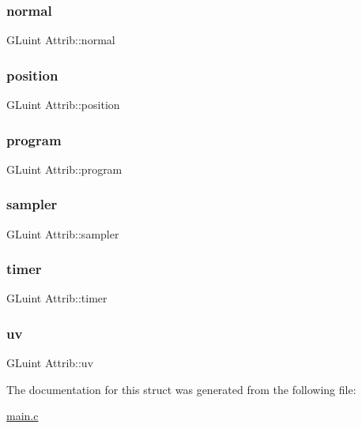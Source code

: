 \subsubsection{\texorpdfstring{normal}{normal}}
{\footnotesize\ttfamily G\+Luint Attrib\+::normal}

\mbox{\label{structAttrib_a2e8900e46275e6dba5de47a6cb3fb014}} 
\subsubsection{\texorpdfstring{position}{position}}
{\footnotesize\ttfamily G\+Luint Attrib\+::position}

\mbox{\label{structAttrib_accbe71d8cd2e04669694902abddf88fd}} 
\subsubsection{\texorpdfstring{program}{program}}
{\footnotesize\ttfamily G\+Luint Attrib\+::program}

\mbox{\label{structAttrib_ab176427e061e47c040d0a8d25488fd6d}} 
\subsubsection{\texorpdfstring{sampler}{sampler}}
{\footnotesize\ttfamily G\+Luint Attrib\+::sampler}

\mbox{\label{structAttrib_aa27da229009adea9e3729e80f7b200b5}} 
\subsubsection{\texorpdfstring{timer}{timer}}
{\footnotesize\ttfamily G\+Luint Attrib\+::timer}

\mbox{\label{structAttrib_a91a6c5203f836990dfd2529a4dd128ce}} 
\subsubsection{\texorpdfstring{uv}{uv}}
{\footnotesize\ttfamily G\+Luint Attrib\+::uv}



The documentation for this struct was generated from the following file\+:\begin{DoxyCompactItemize}
\item 
\hyperlink{main_8c}{main.\+c}\end{DoxyCompactItemize}
